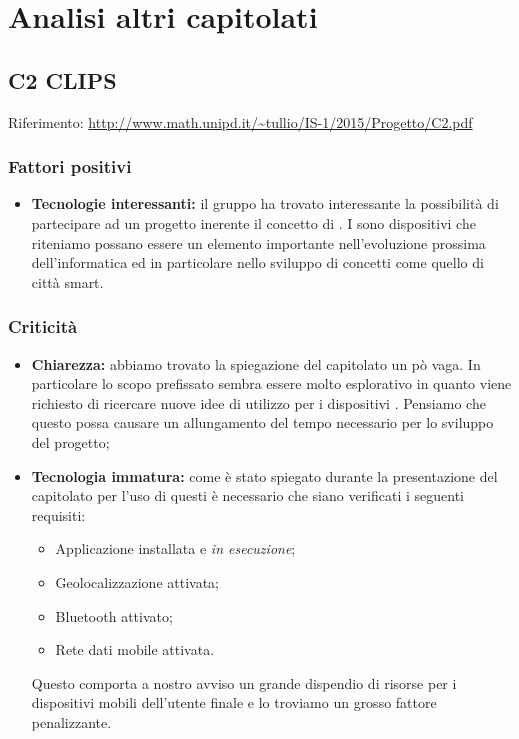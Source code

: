 \documentclass{scalatekids-article}
\begin{document}
\section{Analisi altri capitolati}
\subsection{C2 CLIPS}
Riferimento: \url{http://www.math.unipd.it/~tullio/IS-1/2015/Progetto/C2.pdf}\\
\subsubsection{Fattori positivi}
\begin{itemize}
\item \textbf{Tecnologie interessanti:} il gruppo ha trovato interessante la possibilità di partecipare ad un progetto inerente il concetto di .
I  sono dispositivi che riteniamo possano essere un elemento importante nell'evoluzione prossima dell'informatica ed in particolare nello sviluppo di concetti come quello di città smart.
\end{itemize}
\subsubsection{Criticità}
\begin{itemize}
\item \textbf{Chiarezza:} abbiamo trovato la spiegazione del capitolato un pò vaga. 
In particolare lo scopo prefissato sembra essere molto esplorativo in quanto viene richiesto di ricercare nuove idee di utilizzo per i dispositivi . Pensiamo che questo possa causare un allungamento del tempo necessario per lo sviluppo del progetto;
\item \textbf{Tecnologia immatura:} come è stato spiegato durante la presentazione del capitolato per l'uso di questi  è necessario che siano verificati i seguenti requisiti:
  \begin{itemize}
  \item Applicazione installata e \textit{in esecuzione};
  \item Geolocalizzazione attivata;
  \item Bluetooth attivato;
  \item Rete dati mobile attivata.
  \end{itemize}
  Questo comporta a nostro avviso un grande dispendio di risorse per i dispositivi mobili dell'utente finale e lo troviamo un grosso fattore penalizzante.
\end{itemize}
\end{document}
